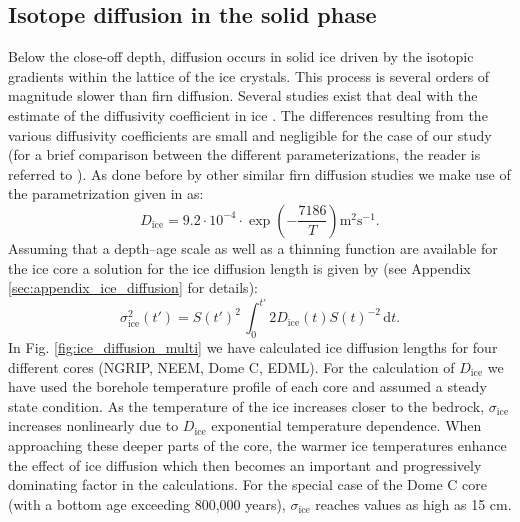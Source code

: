 \documentclass[11pt, draftcls, onecolumn]{IEEEtran} %
\numberwithin{equation}{section}
\numberwithin{table}{section}
\numberwithin{figure}{section}
\begin{document}
\subsection{Isotope diffusion in the solid phase}
\label{ice_diffusion_section}
Below the close-off depth, diffusion occurs in solid ice driven by the isotopic
gradients within the lattice of the ice crystals. 
This process is several orders of magnitude slower than firn diffusion.
Several studies exist that deal with the estimate of the diffusivity 
coefficient in ice \citep{Itagaki1964, Blicks1966, Delibaltas1966, Ramseier1967, Livingston1997}.
The differences resulting from the various diffusivity coefficients are small and
negligible for the case of our study (for a brief comparison between the different parameterizations, 
the reader is referred to \cite{Gkinis2014}).
As done before by other similar firn diffusion studies \citep{Johnsen2000, Simonsen2011, Gkinis2014}
we make use of the parametrization given in \cite{Ramseier1967} as:
\begin{equation}
D_{\mathrm{ice}} = 9.2 \cdot 10^{-4} \cdot \exp \left(- \frac{7186}{T} \right) \mathrm{ m^2 s^{-1}} . 
\label{eq.icediffusivity}
\end{equation}
Assuming that a depth--age scale as well as a thinning function are available for the 
ice core a solution for the ice diffusion length is given by (see Appendix \ref{sec:appendix_ice_diffusion} for details):
\begin{equation}
\sigma_{\mathrm{ice}}^2 \!\left( t' \right) = 
S\! \left( t' \right)^2 \,\int_0^{t'} 2 D_{\mathrm{ice}} \!\left( t \right) S \!\left( t \right) ^{-2} \,\mathrm{d} t.
\label{eq.icediffusion}
\end{equation}
In Fig. \ref{fig:ice_diffusion_multi} we have calculated ice diffusion lengths for four different cores (NGRIP, NEEM, Dome C, EDML).
For the calculation of $D_{\mathrm{ice}}$ we have used the borehole temperature profile of each core and assumed a steady state condition. 
As the temperature of the ice increases closer to the bedrock, $\sigma_{\mathrm{ice}}$ increases nonlinearly 
due to $D_{\mathrm{ice}}$ exponential temperature dependence.
When approaching these deeper parts of the core, the warmer ice temperatures enhance the effect of ice diffusion which then
becomes an important and progressively dominating factor in the calculations.
For the special case of the Dome C core (with a bottom age exceeding 800,000 years), $\sigma_{\mathrm{ice}}$
reaches values as high as 15 $\mathrm{cm}$.
\end{document}
